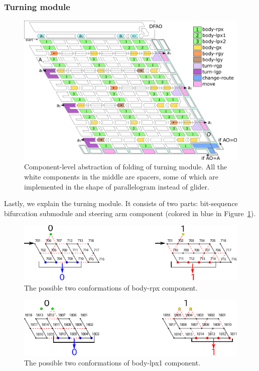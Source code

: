 			\subsubsection{Turning module}

\begin{figure}[t]
\centering
\includegraphics[width=\linewidth]{pic/overall_turn_part.pdf}
\caption{
Component-level abstraction of folding of turning module.
All the white components in the middle are spacers, some of which are implemented in the shape of parallelogram instead of glider. 
 }
\label{fig:overall_turning}
\end{figure}

Lastly, we explain the turning module. 
It consists of two parts: bit-sequence bifurcation submodule and steering arm component (colored in blue in Figure~\ref{fig:overall_turning}). 

\begin{figure}[h]
\centering
\includegraphics[width=0.8\linewidth]{pic/body-rpx.pdf}
\caption{The possible two conformations of body-rpx component.}
\label{fig:body-rpx}
\end{figure}

\begin{figure}[h]
\centering
\includegraphics[width=0.8\linewidth]{pic/body-lpx1.pdf}
\caption{The possible two conformations of body-lpx1 component.}
\label{fig:body-lpx1}
\end{figure}

